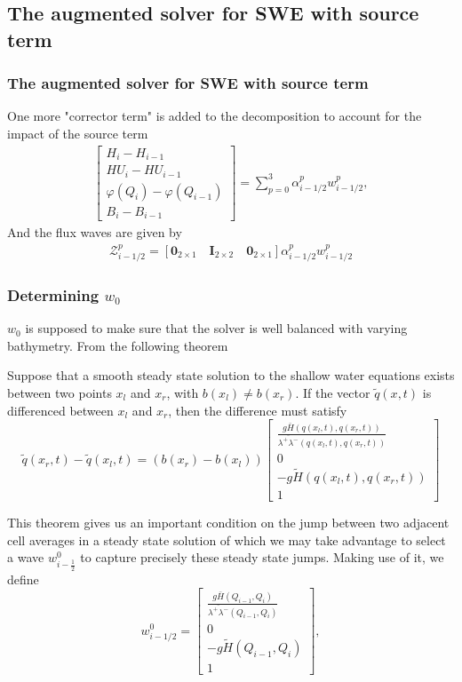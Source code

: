 \documentclass{beamer}
\begin{document}
\subsection{The augmented solver for SWE with source term}
\frame
{
\frametitle{The augmented solver for SWE with source term}
One more "corrector term" is added to the decomposition to account for the impact of the source term
\begin{align*}
\begin{bmatrix}
H_i-H_{i-1}\\
HU_i-HU_{i-1}\\
\varphi(Q_i)-\varphi(Q_{i-1}) \\
B_i-B_{i-1}
\end{bmatrix}=\sum_{p=0}^3 \alpha_{i-1/2}^p w_{i-1/2}^p,
\end{align*}
And the flux waves are given by
\begin{align*}
\mathcal{Z}_{i-1/2}^p =\left[\mathbf{0}_{2\times1} \quad \mathbf{I}_{2\times2} \quad \mathbf{0}_{2\times1}\right] \alpha_{i-1/2}^p w_{i-1/2}^p
\end{align*}
}

\frame
{
\frametitle{Determining $w_0$}
$w_0$ is supposed to make sure that the solver is well balanced with varying bathymetry. From the following theorem

Suppose that a smooth steady state solution to the shallow water equations exists between two points $x_l$ and $x_r$, with $b(x_l) \neq b(x_r)$. If the vector $\tilde{q}(x,t)$ is differenced between $x_l$ and $x_r$, then the difference must satisfy
\begin{equation}
\tilde{q}(x_r,t)-\tilde{q}(x_l,t)=(b(x_r)-b(x_l))\begin{bmatrix}
\frac{g\bar{H}(q(x_l,t),q(x_r,t))}{\overline{\lambda^+ \lambda^-}(q(x_l,t),q(x_r,t))}\\
0\\
-g\tilde{H}(q(x_l,t),q(x_r,t))\\
1
\end{bmatrix}
\end{equation}
}
\frame
{
This theorem gives us an important condition on the jump between two adjacent cell averages in a steady state solution of which we may take advantage to select a wave $w_{i-\frac{1}{2}}^0$ to capture precisely these steady state jumps.  Making use of it, we define
\begin{equation}
w_{i-1/2}^0=\begin{bmatrix}
\frac{g\bar{H}(Q_{i-1},Q_i)}{\overline{\lambda^+ \lambda^-}(Q_{i-1},Q_i)}\\
0\\
-g\tilde{H}(Q_{i-1},Q_i)\\
1
\end{bmatrix},
\end{equation}
}
\end{document}
